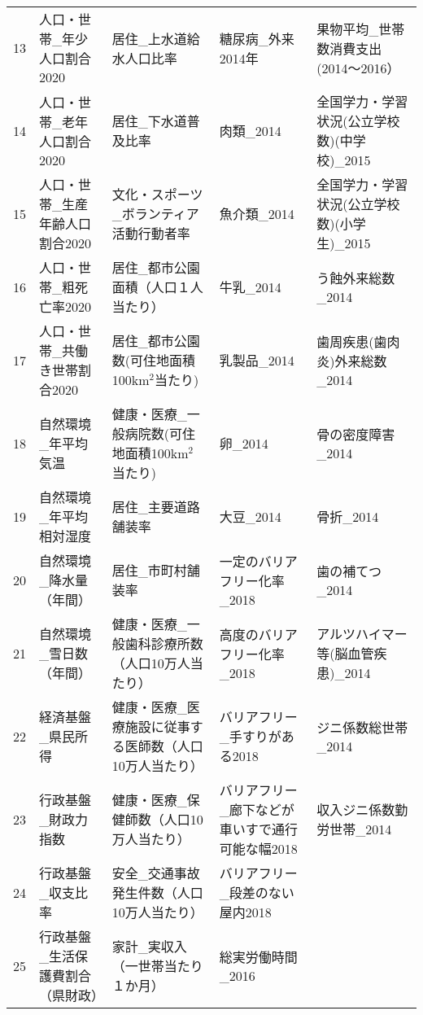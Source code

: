 \begin{table}[ht]
\begin{adjustbox}{width=.5\textwidth}
\begin{tabular}{rllll}
  13 & 人口・世帯\_年少人口割合2020 & 居住\_上水道給水人口比率 & 糖尿病\_外来2014年 & 果物平均\_世帯数消費支出(2014〜2016） \\
  14 & 人口・世帯\_老年人口割合2020 & 居住\_下水道普及比率 & 肉類\_2014 & 全国学力・学習状況(公立学校数)(中学校)\_2015 \\
  15 & 人口・世帯\_生産年齢人口割合2020 & 文化・スポーツ\_ボランティア活動行動者率 & 魚介類\_2014 & 全国学力・学習状況(公立学校数)(小学生)\_2015 \\
  16 & 人口・世帯\_粗死亡率2020 & 居住\_都市公園面積（人口１人当たり） & 牛乳\_2014 & う蝕外来総数\_2014 \\
  17 & 人口・世帯\_共働き世帯割合2020 & 居住\_都市公園数(可住地面積100km$^2$当たり) & 乳製品\_2014 & 歯周疾患(歯肉炎)外来総数\_2014 \\
  18 & 自然環境\_年平均気温 & 健康・医療\_一般病院数(可住地面積100km$^2$当たり) & 卵\_2014 & 骨の密度障害\_2014 \\
  19 & 自然環境\_年平均相対湿度 & 居住\_主要道路舗装率 & 大豆\_2014 & 骨折\_2014 \\
  20 & 自然環境\_降水量（年間） & 居住\_市町村舗装率 & 一定のバリアフリー化率\_2018 & 歯の補てつ\_2014 \\
  21 & 自然環境\_雪日数（年間） & 健康・医療\_一般歯科診療所数（人口10万人当たり） & 高度のバリアフリー化率\_2018 & アルツハイマー等(脳血管疾患)\_2014 \\
  22 & 経済基盤\_県民所得 & 健康・医療\_医療施設に従事する医師数（人口10万人当たり） & バリアフリー\_手すりがある2018 & ジニ係数総世帯\_2014 \\
  23 & 行政基盤\_財政力指数 & 健康・医療\_保健師数（人口10万人当たり） & バリアフリー\_廊下などが車いすで通行可能な幅2018 & 収入ジニ係数勤労世帯\_2014 \\
  24 & 行政基盤\_収支比率 & 安全\_交通事故発生件数（人口10万人当たり） & バリアフリー\_段差のない屋内2018 &  \\
  25 & 行政基盤\_生活保護費割合（県財政） & 家計\_実収入（一世帯当たり１か月） & 総実労働時間\_2016 &  \\
   \hline
\end{tabular}
\end{adjustbox}

\endgroup
\end{table}